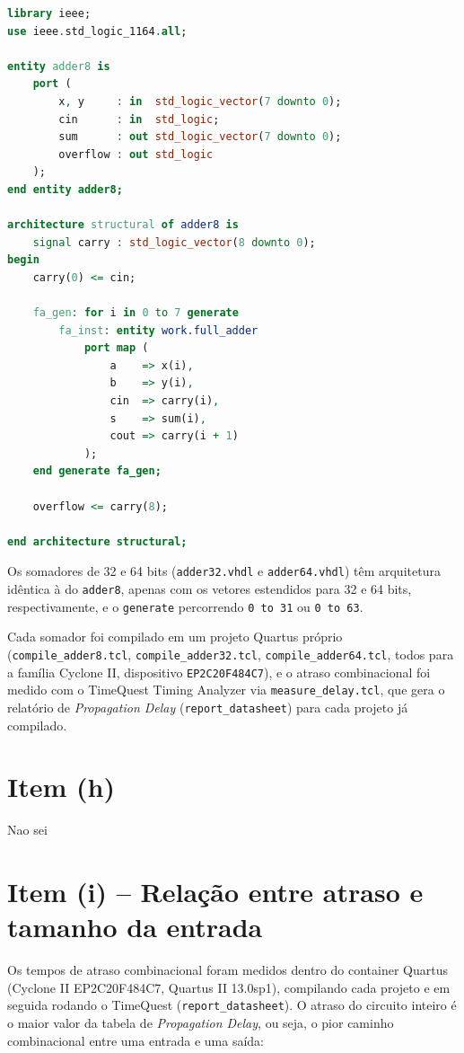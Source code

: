 \documentclass[report, 12pt]{uftreport}
\begin{document}
\begin{lstlisting}[language=VHDL]
library ieee;
use ieee.std_logic_1164.all;

entity adder8 is
    port (
        x, y     : in  std_logic_vector(7 downto 0);
        cin      : in  std_logic;
        sum      : out std_logic_vector(7 downto 0);
        overflow : out std_logic
    );
end entity adder8;

architecture structural of adder8 is
    signal carry : std_logic_vector(8 downto 0);
begin
    carry(0) <= cin;

    fa_gen: for i in 0 to 7 generate
        fa_inst: entity work.full_adder
            port map (
                a    => x(i),
                b    => y(i),
                cin  => carry(i),
                s    => sum(i),
                cout => carry(i + 1)
            );
    end generate fa_gen;

    overflow <= carry(8);

end architecture structural;
\end{lstlisting}

Os somadores de 32 e 64 bits (\texttt{adder32.vhdl} e \texttt{adder64.vhdl}) têm arquitetura idêntica à do \texttt{adder8}, apenas com os vetores estendidos para 32 e 64 bits, respectivamente, e o \texttt{generate} percorrendo \texttt{0 to 31} ou \texttt{0 to 63}.

Cada somador foi compilado em um projeto Quartus próprio (\texttt{compile\_adder8.tcl}, \texttt{compile\_adder32.tcl}, \texttt{compile\_adder64.tcl}, todos para a família Cyclone II, dispositivo \texttt{EP2C20F484C7}), e o atraso combinacional foi medido com o TimeQuest Timing Analyzer via \texttt{measure\_delay.tcl}, que gera o relatório de \textit{Propagation Delay} (\texttt{report\_datasheet}) para cada projeto já compilado.

\section{Item (h)}

Nao sei

\section{Item (i) -- Relação entre atraso e tamanho da entrada}

Os tempos de atraso combinacional foram medidos dentro do container Quartus (Cyclone II EP2C20F484C7, Quartus II 13.0sp1), compilando cada projeto e em seguida rodando o TimeQuest (\texttt{report\_datasheet}). O atraso do circuito inteiro é o maior valor da tabela de \textit{Propagation Delay}, ou seja, o pior caminho combinacional entre uma entrada e uma saída:
\end{document}
